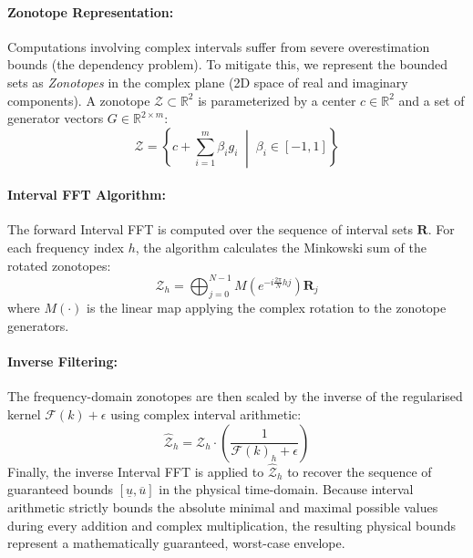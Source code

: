 \documentclass{article}
\begin{document}
\paragraph{Zonotope Representation:} Computations involving complex intervals suffer from severe overestimation bounds (the dependency problem). To mitigate this, we represent the bounded sets as \textit{Zonotopes} in the complex plane (2D space of real and imaginary components). A zonotope $\mathcal{Z} \subset \mathbb{R}^2$ is parameterized by a center $c \in \mathbb{R}^2$ and a set of generator vectors $G \in \mathbb{R}^{2 \times m}$:
\begin{equation}
    \mathcal{Z} = \left\{ c + \sum_{i=1}^m \beta_i g_i \;\middle|\; \beta_i \in [-1, 1] \right\}
\end{equation}

\paragraph{Interval FFT Algorithm:} The forward Interval FFT is computed over the sequence of interval sets $\mathbf{R}$. For each frequency index $h$, the algorithm calculates the Minkowski sum of the rotated zonotopes:
\begin{equation}
    \mathcal{Z}_h = \bigoplus_{j=0}^{N-1} M\left(e^{-i \frac{2\pi}{N} h j}\right) \mathbf{R}_j
\end{equation}
where $M(\cdot)$ is the linear map applying the complex rotation to the zonotope generators.

\paragraph{Inverse Filtering:} The frequency-domain zonotopes are then scaled by the inverse of the regularised kernel $\mathcal{F}(k) + \epsilon$ using complex interval arithmetic:
\begin{equation}
    \hat{\mathcal{Z}}_h = \mathcal{Z}_h \cdot \left(\frac{1}{\mathcal{F}(k)_h + \epsilon}\right)
\end{equation}
Finally, the inverse Interval FFT is applied to $\hat{\mathcal{Z}}_h$ to recover the sequence of guaranteed bounds $[\underline{u}, \overline{u}]$ in the physical time-domain. Because interval arithmetic strictly bounds the absolute minimal and maximal possible values during every addition and complex multiplication, the resulting physical bounds represent a mathematically guaranteed, worst-case envelope.
\end{document}
